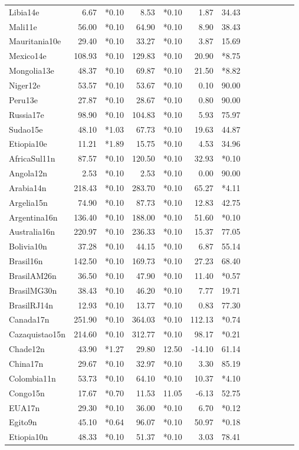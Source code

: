 \begin{landscape}
\begin{table}[htb]
\begin{tabular}{@{}l|rr|rr|rr|rr|rr|rr@{}}
Libia14e&6.67&*0.10&8.53&*0.10&1.87&34.43\\
Mali11e&56.00&*0.10&64.90&*0.10&8.90&38.43\\
Mauritania10e&29.40&*0.10&33.27&*0.10&3.87&15.69\\
Mexico14e&108.93&*0.10&129.83&*0.10&20.90&*8.75\\
Mongolia13e&48.37&*0.10&69.87&*0.10&21.50&*8.82\\
Niger12e&53.57&*0.10&53.67&*0.10&0.10&90.00\\
Peru13e&27.87&*0.10&28.67&*0.10&0.80&90.00\\
Russia17e&98.90&*0.10&104.83&*0.10&5.93&75.97\\
Sudao15e&48.10&*1.03&67.73&*0.10&19.63&44.87\\
Etiopia10e&11.21&*1.89&15.75&*0.10&4.53&34.96\\
AfricaSul11n&87.57&*0.10&120.50&*0.10&32.93&*0.10\\
Angola12n&2.53&*0.10&2.53&*0.10&0.00&90.00\\
Arabia14n&218.43&*0.10&283.70&*0.10&65.27&*4.11\\
Argelia15n&74.90&*0.10&87.73&*0.10&12.83&42.75\\
Argentina16n&136.40&*0.10&188.00&*0.10&51.60&*0.10\\
Australia16n&220.97&*0.10&236.33&*0.10&15.37&77.05\\
Bolivia10n&37.28&*0.10&44.15&*0.10&6.87&55.14\\
Brasil16n&142.50&*0.10&169.73&*0.10&27.23&68.40\\
BrasilAM26n&36.50&*0.10&47.90&*0.10&11.40&*0.57\\
BrasilMG30n&38.43&*0.10&46.20&*0.10&7.77&19.71\\
BrasilRJ14n&12.93&*0.10&13.77&*0.10&0.83&77.30\\
Canada17n&251.90&*0.10&364.03&*0.10&112.13&*0.74\\
Cazaquistao15n&214.60&*0.10&312.77&*0.10&98.17&*0.21\\
Chade12n&43.90&*1.27&29.80&12.50&-14.10&61.14\\
China17n&29.67&*0.10&32.97&*0.10&3.30&85.19\\
Colombia11n&53.73&*0.10&64.10&*0.10&10.37&*4.10\\
Congo15n&17.67&*0.70&11.53&11.05&-6.13&52.75\\
EUA17n&29.30&*0.10&36.00&*0.10&6.70&*0.12\\
Egito9n&45.10&*0.64&96.07&*0.10&50.97&*0.18\\
Etiopia10n&48.33&*0.10&51.37&*0.10&3.03&78.41\\

\end{tabular}
\end{table}
\end{landscape}
